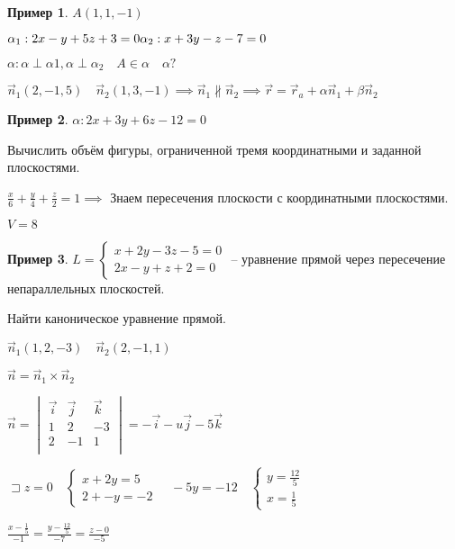 \documentclass{book}
\theoremstyle{definition}
\newtheorem*{example}{Пример}
\begin{document}
\begin{example}
    $A(1, 1, -1)$

     $\alpha_1: 2x-y+5z+3 = 0\\ \alpha_2: x+3y-z-7=0$

      $\alpha: \alpha \perp \alpha 1, \alpha\perp \alpha_2\quad A\in \alpha\quad \alpha ?$

      $\vec n_1(2, -1, 5)\quad \vec n_2(1, 3, -1) \implies \vec n_1 \not\parallel \vec n_2 \implies  \vec r = \vec r_a + \alpha \vec n_1 + \beta \vec n_2$
\end{example}

\begin{example}
    $\alpha: 2x+3y+6z-12=0$

    Вычислить объём фигуры, ограниченной тремя координатными и заданной плоскостями. 

     $\frac{x}{6} + \frac{y}{4} + \frac{z}{2} = 1 \implies $ Знаем пересечения плоскости с координатными плоскостями.

     $V = 8$
\end{example}

\begin{example}
    $L = \begin{cases}
        x+2y-3z-5=0\\
        2x-y+z+2=0
    \end{cases}$ -- уравнение прямой через пересечение непараллельных плоскостей.

    Найти каноническое уравнение прямой.

    $\vec n_1(1, 2, -3)\quad \vec n_2(2, -1, 1)$

    $\vec n = \vec n_1 \times \vec n_2$

    $\vec n =
    \begin{vmatrix}
        \vec i&\vec j &\vec k\\ 1 & 2 & -3\\ 2 & -1 & 1\\
    \end{vmatrix} = -\vec i - u\vec j - 5\vec k$

    $\sqsupset z = 0\quad \begin{cases}
        x+2y=5\\ 2+-y=-2
    \end{cases}\quad -5y = -12\quad \begin{cases}
        y = \frac{12}{5}\\ x = \frac{1}{5}
    \end{cases}$ 

    $\frac{x-\frac{1}{5}}{-1} = \frac{y - \frac{12}{5}}{-7} = \frac{z-0}{-5}$
\end{example}
\end{document}
